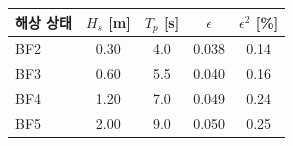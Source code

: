
\begin{tabular}{lcccc}
\toprule
해상 상태 & $H_s$ [m] & $T_p$ [s] & $\epsilon$ & $\epsilon^2$ [\%] \\
\midrule
BF2 & 0.30 & 4.0 & 0.038 & 0.14 \\
BF3 & 0.60 & 5.5 & 0.040 & 0.16 \\
BF4 & 1.20 & 7.0 & 0.049 & 0.24 \\
BF5 & 2.00 & 9.0 & 0.050 & 0.25 \\
\bottomrule
\end{tabular}

